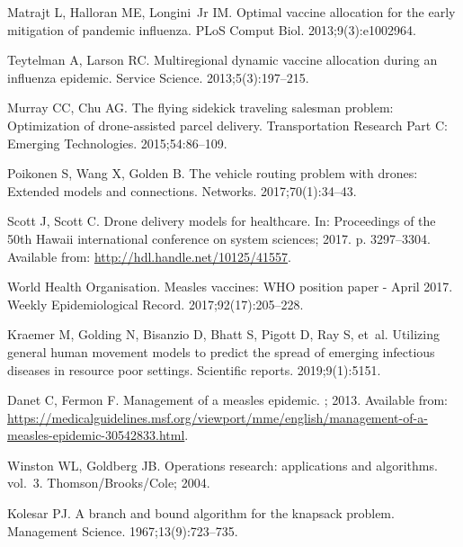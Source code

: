 \documentclass[10pt,letterpaper]{article}
\begin{document}
\begin{thebibliography}{10}
Matrajt L, Halloran ME, Longini~Jr IM.
\newblock Optimal vaccine allocation for the early mitigation of pandemic
  influenza.
\newblock PLoS Comput Biol. 2013;9(3):e1002964.

Teytelman A, Larson RC.
\newblock Multiregional dynamic vaccine allocation during an influenza
  epidemic.
\newblock Service Science. 2013;5(3):197--215.

Murray CC, Chu AG.
\newblock The flying sidekick traveling salesman problem:
  \uppercase{O}ptimization of drone-assisted parcel delivery.
\newblock Transportation Research Part C: Emerging Technologies.
  2015;54:86--109.

Poikonen S, Wang X, Golden B.
\newblock The vehicle routing problem with drones: \uppercase{E}xtended models
  and connections.
\newblock Networks. 2017;70(1):34--43.

Scott J, Scott C.
\newblock Drone delivery models for healthcare.
\newblock In: Proceedings of the 50th Hawaii international conference on system
  sciences; 2017. p. 3297--3304.
\newblock Available from: \url{http://hdl.handle.net/10125/41557}.

{World Health Organisation}.
\newblock Measles vaccines: \uppercase{WHO} position paper - \uppercase{A}pril
  2017.
\newblock Weekly Epidemiological Record. 2017;92(17):205--228.

Kraemer M, Golding N, Bisanzio D, Bhatt S, Pigott D, Ray S, et~al.
\newblock Utilizing general human movement models to predict the spread of
  emerging infectious diseases in resource poor settings.
\newblock Scientific reports. 2019;9(1):5151.

Danet C, Fermon F.
\newblock Management of a measles epidemic.
;
  2013.
\newblock Available from:
  \url{https://medicalguidelines.msf.org/viewport/mme/english/management-of-a-measles-epidemic-30542833.html}.

Winston WL, Goldberg JB.
\newblock Operations research: applications and algorithms. vol.~3.
\newblock \uppercase{T}homson/\uppercase{B}rooks/\uppercase{C}ole; 2004.

Kolesar PJ.
\newblock A branch and bound algorithm for the knapsack problem.
\newblock Management Science. 1967;13(9):723--735.


\end{thebibliography}
\end{document}
